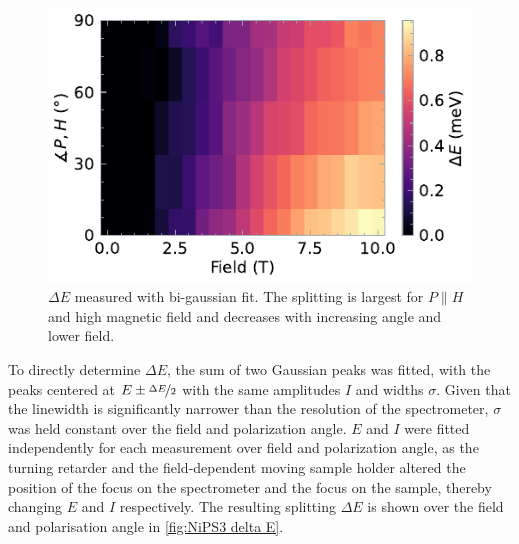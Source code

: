 \documentclass[
	twoside,
	parskip=half,
	a4paper,
]{scrbook}
\begin{document}
\begin{figure}
	\centering
	\includegraphics{../figures/2024-04-21 NiPS3 DeltaE.pdf}
	\caption{$\Delta E$ measured with bi-gaussian fit. The splitting is largest for $P\parallel H$ and high magnetic field and decreases with increasing angle and lower field.}
	\label{fig:NiPS3 delta E}
\end{figure}
To directly determine $\Delta E$, the sum of two Gaussian peaks was fitted, with the peaks centered at $E\pm \nicefrac{\Delta E}{2}$ with the same amplitudes $I$ and widths $\sigma$.
Given that the linewidth is significantly narrower \cite{NiPS3_magnon_gap} than the resolution of the spectrometer, $\sigma$ was held constant over the field and polarization angle.
$E$ and $I$ were fitted independently for each measurement over field and polarization angle, as the turning retarder and the field-dependent moving sample holder altered the position of the focus on the spectrometer and the focus on the sample, thereby changing $E$ and $I$ respectively.
The resulting splitting $\Delta E$ is shown over the field and polarisation angle in \autoref{fig:NiPS3 delta E}.
\end{document}
